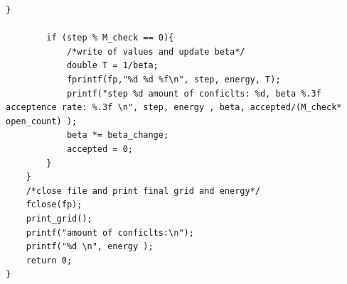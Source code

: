 \begin{lstlisting}[style=Cstyle]
        }
    
        if (step % M_check == 0){ 
            /*write of values and update beta*/
            double T = 1/beta; 
            fprintf(fp,"%d %d %f\n", step, energy, T);
            printf("step %d amount of conficlts: %d, beta %.3f acceptence rate: %.3f \n", step, energy , beta, accepted/(M_check* open_count) );
            beta *= beta_change;
            accepted = 0;
        }
    }
    /*close file and print final grid and energy*/
    fclose(fp);
    print_grid();
    printf("amount of conficlts:\n");
    printf("%d \n", energy );
    return 0;
}
\end{lstlisting}
